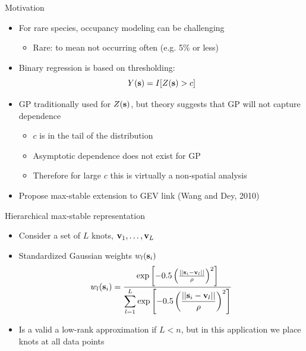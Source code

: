 \documentclass{beamer}
\begin{document}
\begin{frame}{Motivation}
	\begin{itemize} \setlength{\itemsep}{1em}
		\item For rare species, occupancy modeling can be challenging \vspace{0.5em}
		\begin{itemize} \setlength{\itemsep}{0.5em}
			\item \alert{Rare}: to mean not occurring often (e.g. 5\% or less)
		\end{itemize}
		\item Binary regression is based on thresholding: $$Y(\mathbf{s}) = I[Z(\mathbf{s}) > c]$$
		\item GP traditionally used for $Z(\mathbf{s})$, but theory suggests that GP will not capture dependence  \vspace{0.5em}
		\begin{itemize} \setlength{\itemsep}{0.5em}
			\item $c$ is in the tail of the distribution
			\item Asymptotic dependence does not exist for GP
			\item Therefore for large $c$ this is virtually a non-spatial analysis
		\end{itemize}
		\item Propose max-stable extension to GEV link (Wang and Dey, 2010)
	\end{itemize}
\end{frame}

\begin{frame}{Hierarchical max-stable representation}
	\begin{itemize} \setlength{\itemsep}{1em}
		\item Consider a set of $L$ knots, $\mathbf{v}_1, \ldots, \mathbf{v}_L$
		\item Standardized Gaussian weights $w_l(\mathbf{s}_i)$
		\begin{align*}
		w_l(\mathbf{s}_i) = \frac{ \exp\left[ -0.5 \left( \frac{ || \mathbf{s}_i - \mathbf{v}_l || }{ \rho} \right)^2 \right]}{ \displaystyle \sum_{l = 1}^L \exp\left[ -0.5 \left( \frac{ || \mathbf{s}_i - \mathbf{v}_l || }{ \rho} \right)^2 \right] }
		\end{align*}
		\item Is a valid a low-rank approximation if $L < n$, but in this application we place knots at all data points
	\end{itemize}
\end{frame}
\end{document}

